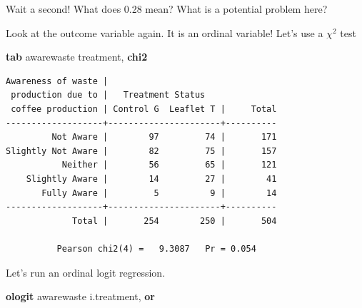 \documentclass[
]{book}
\newenvironment{Shaded}{\begin{snugshade}}{\end{snugshade}}
\newcommand{\FunctionTok}[1]{\textcolor[rgb]{0.13,0.29,0.53}{\textbf{#1}}}
\newcommand{\KeywordTok}[1]{\textcolor[rgb]{0.13,0.29,0.53}{\textbf{#1}}}
\newcommand{\NormalTok}[1]{#1}
\begin{document}
Wait a second! What does 0.28 mean? What is a potential problem here?

Look at the outcome variable again. It is an ordinal variable! Let's use a \(\chi^2\) test

\begin{Shaded}
\begin{Highlighting}[]
\KeywordTok{tab}\NormalTok{ awarewaste treatment, }\FunctionTok{chi2}
\end{Highlighting}
\end{Shaded}

\begin{verbatim}
Awareness of waste |
 production due to |   Treatment Status
 coffee production | Control G  Leaflet T |     Total
-------------------+----------------------+----------
         Not Aware |        97         74 |       171 
Slightly Not Aware |        82         75 |       157 
           Neither |        56         65 |       121 
    Slightly Aware |        14         27 |        41 
       Fully Aware |         5          9 |        14 
-------------------+----------------------+----------
             Total |       254        250 |       504 

          Pearson chi2(4) =   9.3087   Pr = 0.054
\end{verbatim}

Let's run an ordinal logit regression.

\begin{Shaded}
\begin{Highlighting}[]
\KeywordTok{ologit}\NormalTok{ awarewaste i.treatment, }\KeywordTok{or}
\end{Highlighting}
\end{Shaded}
\end{document}
